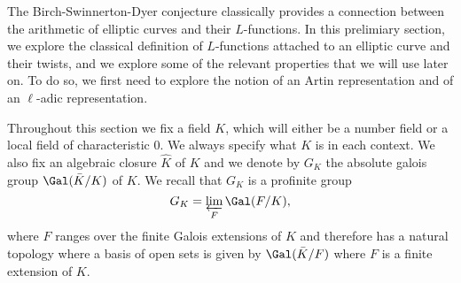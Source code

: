The Birch-Swinnerton-Dyer conjecture classically provides a connection between the arithmetic of elliptic curves and their $L$-functions. In this prelimiary section, we explore the classical definition of $L$-functions attached to an elliptic curve and their twists, and we explore some of the relevant properties that we will use later on. To do so, we first need to explore the notion of an Artin representation and of an $\ell$-adic representation. 

Throughout this section we fix a field $K$, which will either be a number field or a local field of characteristic $0$. We always specify what $K$ is in each context. We also fix an algebraic closure $\hat{K}$ of $K$ and we denote by $G_K$ the absolute galois group $\Gal(\bar{K}/K)$ of $K$. We recall that $G_K$ is a profinite group
$$G_K=\varprojlim_{F}\Gal(F/K),$$
where $F$ ranges over the finite Galois extensions of $K$ and therefore has a natural topology where a basis of open sets is given by $\Gal(\bar{K}/F)$ where $F$ is a finite extension of $K$.




